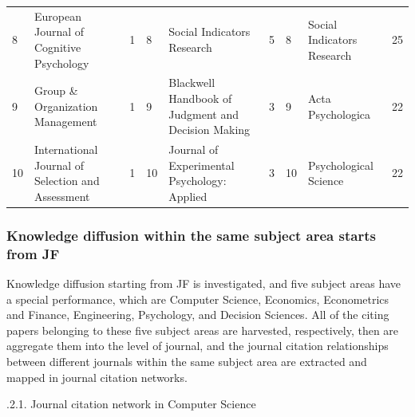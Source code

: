\documentclass[11pt,a4paper]{elsarticle} %
\begin{document}
\begin{landscape}
\begin{table}[!htbp]
{\begin{tabular}{p{1.5cm}<{\centering} p{6cm}<{\centering} p{1.5cm}<{\centering}|p{1.5cm}<{\centering} p{6cm}<{\centering} p{1.5cm}<{\centering}|p{1.5cm}<{\centering} p{6cm}<{\centering} p{1.5cm}<{\centering}}
8 & European Journal of Cognitive Psychology & 1 & 8 & Social Indicators Research & 5 & 8 & Social Indicators Research & 25\\
9 & Group \& Organization Management & 1 & 9 & Blackwell Handbook of Judgment and Decision Making & 3 & 9 & Acta Psychologica & 22\\
10 & International Journal of Selection and Assessment & 1 & 10 & Journal of Experimental Psychology: Applied & 3 & 10 & Psychological Science & 22\\
  \hline
  \hline
    \end{tabular}}
\end{table}
\end{landscape}

\subsubsection{Knowledge diffusion within the same subject area starts
from
JF}\label{knowledge-diffusion-within-the-same-subject-area-starts-from-jf}

Knowledge diffusion starting from JF is investigated, and five subject
areas have a special performance, which are Computer Science, Economics,
Econometrics and Finance, Engineering, Psychology, and Decision
Sciences. All of the citing papers belonging to these five subject areas
are harvested, respectively, then are aggregate them into the level of
journal, and the journal citation relationships between different
journals within the same subject area are extracted and mapped in
journal citation networks.

.2.1. Journal citation network in Computer Science
\end{document}
